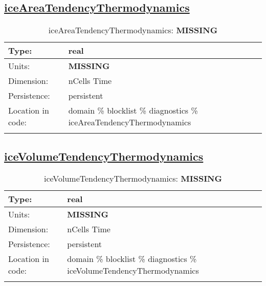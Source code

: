 \subsection[iceAreaTendencyThermodynamics]{\hyperref[sec:var_tab_diagnostics]{iceAreaTendencyThermodynamics}}
\label{subsec:var_sec_diagnostics_iceAreaTendencyThermodynamics}
\begin{center}
\begin{longtable}{| p{2.0in} | p{4.0in} |}
        \hline 
        Type: & real \\
        \hline 
        Units: & {\bf \color{red} MISSING} \\
        \hline 
        Dimension: & nCells Time \\
        \hline 
        Persistence: & persistent \\
        \hline 
         Location in code: & domain \% blocklist \% diagnostics \% iceAreaTendencyThermodynamics \\
         \hline 
    \caption{iceAreaTendencyThermodynamics: {\bf \color{red} MISSING}}
\end{longtable}
\end{center}
\subsection[iceVolumeTendencyThermodynamics]{\hyperref[sec:var_tab_diagnostics]{iceVolumeTendencyThermodynamics}}
\label{subsec:var_sec_diagnostics_iceVolumeTendencyThermodynamics}
\begin{center}
\begin{longtable}{| p{2.0in} | p{4.0in} |}
        \hline 
        Type: & real \\
        \hline 
        Units: & {\bf \color{red} MISSING} \\
        \hline 
        Dimension: & nCells Time \\
        \hline 
        Persistence: & persistent \\
        \hline 
         Location in code: & domain \% blocklist \% diagnostics \% iceVolumeTendencyThermodynamics \\
         \hline 
    \caption{iceVolumeTendencyThermodynamics: {\bf \color{red} MISSING}}
\end{longtable}
\end{center}
